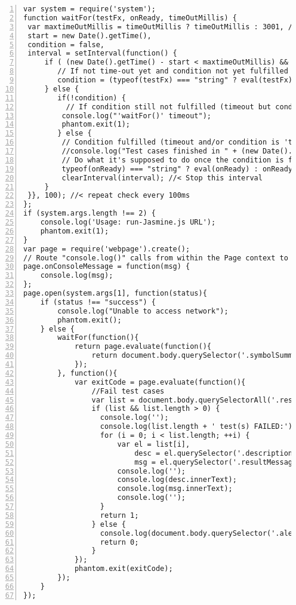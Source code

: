 \documentclass[a4paper,11pt]{article}
\begin{document}
\begin{lstlisting}[label=some-code,caption=Player.js,keywordstyle=\color{blue},style = customjava, numbers=left]
var system = require('system');
function waitFor(testFx, onReady, timeOutMillis) {
 var maxtimeOutMillis = timeOutMillis ? timeOutMillis : 3001, //< Default Max Timeout is 3s
 start = new Date().getTime(),
 condition = false,
 interval = setInterval(function() {
     if ( (new Date().getTime() - start < maxtimeOutMillis) && !condition ) {
        // If not time-out yet and condition not yet fulfilled
        condition = (typeof(testFx) === "string" ? eval(testFx) : testFx()); //defensive code
     } else {
        if(!condition) {
          // If condition still not fulfilled (timeout but condition is 'false')
         console.log("'waitFor()' timeout");
         phantom.exit(1);
        } else {
         // Condition fulfilled (timeout and/or condition is 'true')
         //console.log("Test cases finished in " + (new Date().getTime() - start) + "ms.");
         // Do what it's supposed to do once the condition is fulfilled
         typeof(onReady) === "string" ? eval(onReady) : onReady(); 
         clearInterval(interval); //< Stop this interval
     }
 }}, 100); //< repeat check every 100ms
};
if (system.args.length !== 2) {
    console.log('Usage: run-Jasmine.js URL');
    phantom.exit(1);
}
var page = require('webpage').create();
// Route "console.log()" calls from within the Page context to the main Phantom context (i.e. current "this")
page.onConsoleMessage = function(msg) {
    console.log(msg);
};
page.open(system.args[1], function(status){
    if (status !== "success") {
        console.log("Unable to access network");
        phantom.exit();
    } else {
        waitFor(function(){
            return page.evaluate(function(){
                return document.body.querySelector('.symbolSummary .pending') === null
            });
        }, function(){
            var exitCode = page.evaluate(function(){
                //Fail test cases
                var list = document.body.querySelectorAll('.results > #details > .specDetail.failed');
                if (list && list.length > 0) {
                  console.log('');
                  console.log(list.length + ' test(s) FAILED:');
                  for (i = 0; i < list.length; ++i) {
                      var el = list[i],
                          desc = el.querySelector('.description'),
                          msg = el.querySelector('.resultMessage.fail');
                      console.log('');
                      console.log(desc.innerText);
                      console.log(msg.innerText);
                      console.log('');
                  }
                  return 1;
                } else {
                  console.log(document.body.querySelector('.alert > .passingAlert.bar').innerText);
                  return 0;
                }
            });
            phantom.exit(exitCode);
        });
    }
});
\end{lstlisting}
\end{document}
